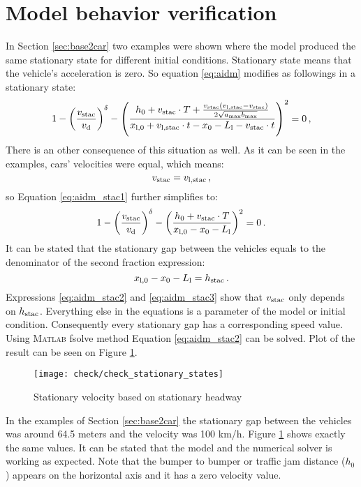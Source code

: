 	\section{Model behavior verification}
		In Section \ref{sec:base2car} two examples were shown where the model produced the same stationary state for different initial conditions. Stationary state means that the vehicle's acceleration is zero. So equation \ref{eq:aidm} modifies as followings in a stationary state:
		\begin{equation}
		1 - \left ( \frac{v_{\rm stac}}{v_{\rm d}} \right )^{\rm \delta} - \left ( \frac{h_0+v_{\rm stac}\cdot T+\frac{v_{\rm stac}(v_{\rm l,stac}-v_{\rm stac})}{2\sqrt{a_{\rm max} b_{\rm max}}}}{x_{\rm l,0}+v_{\rm l, stac}\cdot t-x_{0} - L_{\rm l} - v_{\rm stac}\cdot t} \right )^2=0\,,
		\label{eq:aidm_stac1}
		\end{equation}
		There is an other consequence of this situation as well. As it can be seen in the examples, cars' velocities were equal, which means:
		\begin{equation}
			v_{\rm stac}=v_{\rm l,stac}\,,
		\end{equation}
		so Equation \ref{eq:aidm_stac1} further simplifies to:
		\begin{equation}
			1 - \left ( \frac{v_{\rm stac}}{v_{\rm d}} \right )^{\rm \delta} - \left ( \frac{h_0+v_{\rm stac}\cdot T}{x_{\rm l,0}-x_{0} - L_{\rm l}} \right )^2=0\,.
			\label{eq:aidm_stac2}
		\end{equation}
		It can be stated that the stationary gap between the vehicles equals to the denominator of the second fraction expression:
		\begin{equation}
		x_{\rm l,0}-x_{0} - L_{\rm l}=h_{\rm stac}\,.
		\label{eq:aidm_stac3}
		\end{equation}
		Expressions \ref{eq:aidm_stac2} and \ref{eq:aidm_stac3} show that $v_{\rm stac}$ only depends on $h_{\rm stac}$. Everything else in the equations is a parameter of the model or initial condition. Consequently every stationary gap has a corresponding speed value. Using \textsc{Matlab} fsolve method Equation \ref{eq:aidm_stac2} can be solved. Plot of the result can be seen on Figure \ref{fig:aidm_stac}.
		\begin{figure}[ht]
			\centering
			\texttt{[image: check/check\_stationary\_states]}
			\caption{Stationary velocity based on stationary headway}
			\label{fig:aidm_stac}
		\end{figure}

		In the examples of Section \ref{sec:base2car} the stationary gap between the vehicles was around 64.5 meters and the velocity was 100 km/h. Figure \ref{fig:aidm_stac} shows exactly the same values. It can be stated that the model and the numerical solver is working as expected. Note that the bumper to bumper or traffic jam distance ($h_0$) appears on the horizontal axis and it has a zero velocity value.

